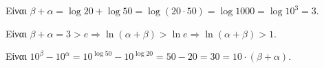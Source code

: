\begin{alist}
\item Είναι $\beta + \alpha = \log 20 + \log 50 = \log(20 \cdot 50) = \log 1000 = \log 10^3 = 3$.
\item Είναι $\beta + \alpha = 3 > e \Rightarrow \ln(\alpha + \beta) > \ln e \Rightarrow \ln(\alpha + \beta) > 1$.
\item Είναι $10^\beta - 10^\alpha = 10^{\log 50} - 10^{\log 20} = 50 - 20 = 30 = 10 \cdot (\beta + \alpha)$.
\end{alist}

